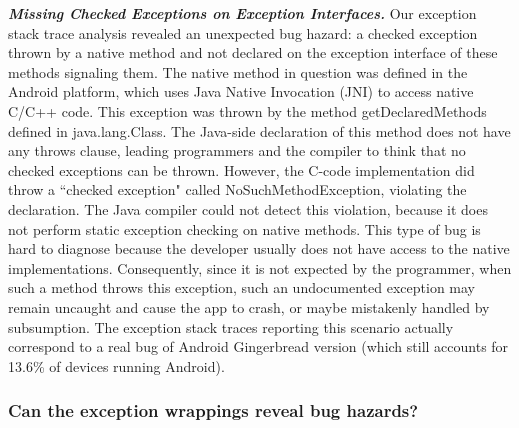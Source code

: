 \emph{\textbf{Missing Checked Exceptions on Exception Interfaces.}} 
Our exception stack trace analysis revealed an unexpected bug hazard: a 
checked exception thrown by a native method and not declared on the exception 
interface of these methods signaling them. The native method in question was defined in
 the Android platform, which uses Java Native Invocation (JNI) to access 
native C/C++ code. This exception was thrown by the method getDeclaredMethods defined in java.lang.Class. 
The Java-side declaration of this method does not have any throws clause, 
leading programmers and the compiler to think that no checked exceptions can be thrown.
 However, the C-code implementation did throw a ``checked exception" called NoSuchMethodException, 
violating the declaration. The Java compiler could not detect this violation, because it does 
not perform static exception checking on native methods. This type of bug is hard to diagnose
because the developer usually does not have access to the native implementations. 
Consequently, since it is not expected by the programmer, when such a method throws 
this exception, such an undocumented exception may remain
uncaught and cause the app to crash, or maybe mistakenly handled by subsumption.
The exception stack traces reporting this scenario actually correspond
to a real bug of Android 
Gingerbread version (which still accounts for 13.6\% of devices running Android).

\bigskip


\bigskip

\subsubsection{Can the exception wrappings reveal bug hazards?}


